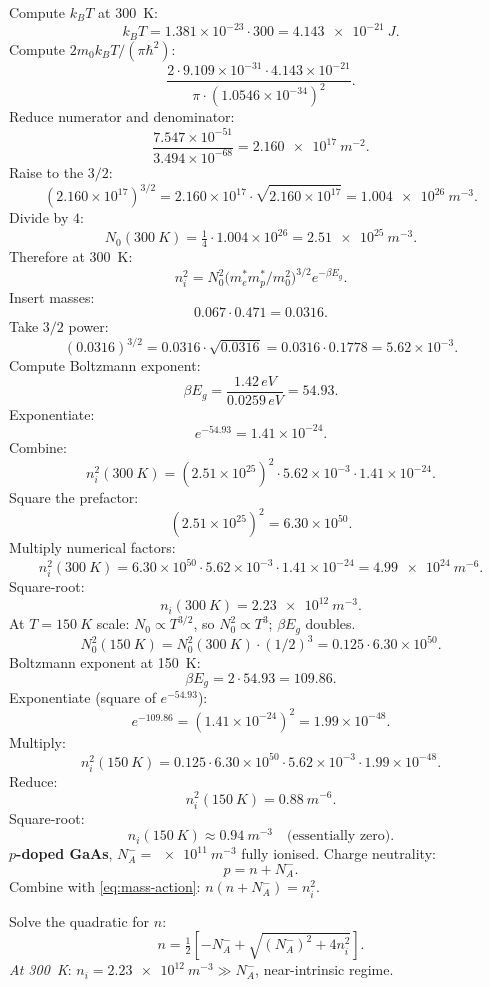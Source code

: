\documentclass[11pt]{article}
\begin{document}
Compute $k_B T$ at \SI{300}{K}:
\[
k_B T = 1.381\times 10^{-23}\cdot 300 = \SI{4.143e-21}{J}.
\]
Compute $2 m_0 k_B T/(\pi\hbar^2)$:
\[
\frac{2\cdot 9.109\times 10^{-31}\cdot 4.143\times 10^{-21}}{\pi\cdot (1.0546\times 10^{-34})^2}.
\]
Reduce numerator and denominator:
\[
\frac{7.547\times 10^{-51}}{3.494\times 10^{-68}} = \SI{2.160e17}{m^{-2}}.
\]
Raise to the $3/2$:
\[
(2.160\times 10^{17})^{3/2} = 2.160\times 10^{17}\cdot\sqrt{2.160\times 10^{17}} = \SI{1.004e26}{m^{-3}}.
\]
Divide by $4$:
\[
N_0(\SI{300}{K}) = \tfrac14\cdot 1.004\times 10^{26} = \SI{2.51e25}{m^{-3}}.
\]
Therefore at \SI{300}{K}:
\[
n_i^2 = N_0^2 \bigl(m_e^* m_p^*/m_0^2\bigr)^{3/2} e^{-\beta E_g}.
\]
Insert masses:
\[
0.067\cdot 0.471 = 0.0316.
\]
Take $3/2$ power:
\[
(0.0316)^{3/2} = 0.0316\cdot\sqrt{0.0316} = 0.0316\cdot 0.1778 = 5.62\times 10^{-3}.
\]
Compute Boltzmann exponent:
\[
\beta E_g = \frac{1.42\,\si{eV}}{0.0259\,\si{eV}} = 54.93.
\]
Exponentiate:
\[
e^{-54.93} = 1.41\times 10^{-24}.
\]
Combine:
\[
n_i^2(\SI{300}{K}) = (2.51\times 10^{25})^2\cdot 5.62\times 10^{-3}\cdot 1.41\times 10^{-24}.
\]
Square the prefactor:
\[
(2.51\times 10^{25})^2 = 6.30\times 10^{50}.
\]
Multiply numerical factors:
\[
n_i^2(\SI{300}{K}) = 6.30\times 10^{50}\cdot 5.62\times 10^{-3}\cdot 1.41\times 10^{-24} = \SI{4.99e24}{m^{-6}}.
\]
Square-root:
\[
\boxed{\;n_i(\SI{300}{K}) = \SI{2.23e12}{m^{-3}}.\;}
\]
At $T=\SI{150}{K}$ scale: $N_0\propto T^{3/2}$, so $N_0^2\propto T^3$; $\beta E_g$ doubles.
\[
N_0^2(\SI{150}{K}) = N_0^2(\SI{300}{K})\cdot(1/2)^3 = 0.125\cdot 6.30\times 10^{50}.
\]
Boltzmann exponent at \SI{150}{K}:
\[
\beta E_g = 2\cdot 54.93 = 109.86.
\]
Exponentiate (square of $e^{-54.93}$):
\[
e^{-109.86} = (1.41\times 10^{-24})^2 = 1.99\times 10^{-48}.
\]
Multiply:
\[
n_i^2(\SI{150}{K}) = 0.125\cdot 6.30\times 10^{50}\cdot 5.62\times 10^{-3}\cdot 1.99\times 10^{-48}.
\]
Reduce:
\[
n_i^2(\SI{150}{K}) = \SI{0.88}{m^{-6}}.
\]
Square-root:
\[
\boxed{\;n_i(\SI{150}{K}) \approx \SI{0.94}{m^{-3}}\quad\text{(essentially zero).}\;}
\]
\textbf{$p$-doped GaAs}, $N_A^- = \SI{e11}{m^{-3}}$ fully ionised. Charge neutrality:
\[
p = n + N_A^-.
\]
Combine with \eqref{eq:mass-action}: $n(n+N_A^-) = n_i^2$.

Solve the quadratic for $n$:
\[
n = \tfrac12\!\left[-N_A^- + \sqrt{(N_A^-)^2 + 4 n_i^2}\right].
\]
\emph{At \SI{300}{K}}: $n_i = \SI{2.23e12}{m^{-3}}\gg N_A^-$, near-intrinsic regime.
\end{document}
